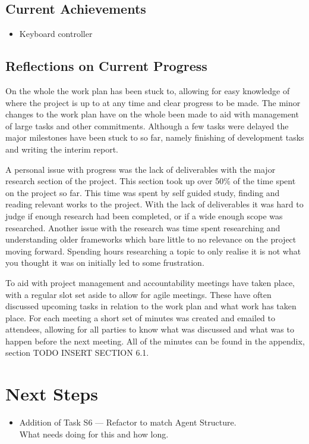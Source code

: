 \documentclass[a4paper]{article}
\begin{document}
\subsection{Current Achievements}
\begin{itemize}
    \item Keyboard controller
\end{itemize}

\subsection{Reflections on Current Progress}
On the whole the work plan has been stuck to, allowing for easy knowledge of where the project is up to at any time and clear progress to be made.
The minor changes to the work plan have on the whole been made to aid with management of large tasks and other commitments.
Although a few tasks were delayed the major milestones have been stuck to so far, namely finishing of development tasks and writing the interim report.
\par
A personal issue with progress was the lack of deliverables with the major research section of the project.
This section took up over 50\% of the time spent on the project so far.
This time was spent by self guided study, finding and reading relevant works to the project.
With the lack of deliverables it was hard to judge if enough research had been completed, or if a wide enough scope was researched.
Another issue with the research was time spent researching and understanding older frameworks which bare little to no relevance on the project moving forward.
Spending hours researching a topic to only realise it is not what you thought it was on initially led to some frustration.
\par
To aid with project management and accountability meetings have taken place, with a regular slot set aside to allow for agile meetings.
These have often discussed upcoming tasks in relation to the work plan and what work has taken place.
For each meeting a short set of minutes was created and emailed to attendees, allowing for all parties to know what was discussed and what was to happen before the next meeting.
All of the minutes can be found in the appendix, section TODO INSERT SECTION 6.1.

\section{Next Steps}
\begin{itemize}
    \item Addition of Task S6 --- Refactor to match Agent Structure. \\
    What needs doing for this and how long.
\end{itemize}
\end{document}
